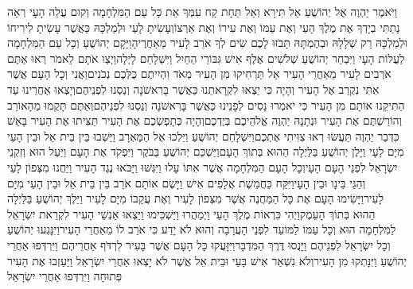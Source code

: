 \documentclass[../main/main.tex]{subfiles}
\begin{document}
\begin{multicols*}{\ncols}
וַיֹּאמֶר יַהְוֶה אֶל יְהוֹשֻׁעַ אַל תִּירָא וְאַל תֵּחָת קַח עִמְּךָ אֵת כָּל עַם הַמִּלְחָמָה וְקוּם עֲלֵה הָעָי רְאֵה נָתַתִּי בְיָדְךָ אֶת מֶלֶךְ הָעַי וְאֶת עַמּוֹ וְאֶת עִירוֹ וְאֶת אַרְצוֹ\PreVerseSpace{}וְעָשִׂיתָ לָעַי וּלְמַלְכָּהּ כַּאֲשֶׁר עָשִׂיתָ לִירִיחוֹ וּלְמַלְכָּהּ רַק שְׁלָלָהּ וּבְהֶמְתָּהּ תָּבֹזּוּ לָכֶם שִׂים לְךָ אֹרֵב לָעִיר מֵאַחֲרֶיהָ\PreVerseSpace{}וַיָּקָם יְהוֹשֻׁעַ וְכָל עַם הַמִּלְחָמָה לַעֲלוֹת הָעָי וַיִּבְחַר יְהוֹשֻׁעַ שְׁלֹשִׁים אֶלֶף אִישׁ גִּבּוֹרֵי הַחַיִל וַיִּשְׁלָחֵם לָיְלָה\PreVerseSpace{}וַיְצַו אֹתָם לֵאמֹר רְאוּ אַתֶּם אֹרְבִים לָעִיר מֵאַחֲרֵי הָעִיר אַל תַּרְחִיקוּ מִן הָעִיר מְאֹד וִהְיִיתֶם כֻּלְּכֶם נְכֹנִים\PreVerseSpace{}וַאֲנִי וְכָל הָעָם אֲשֶׁר אִתִּי נִקְרַב אֶל הָעִיר וְהָיָה כִּי יֵצְאוּ לִקְרָאתֵנוּ כַּאֲשֶׁר בָּרִאשֹׁנָה וְנַסְנוּ לִפְנֵיהֶם\PreVerseSpace{}וְיָצְאוּ אַחֲרֵינוּ עַד הַתִּיקֵנוּ אוֹתָם מִן הָעִיר כִּי יֹאמְרוּ נָסִים לְפָנֵינוּ כַּאֲשֶׁר בָּרִאשֹׁנָה וְנַסְנוּ לִפְנֵיהֶם\PreVerseSpace{}וְאַתֶּם תָּקֻמוּ מֵהָאוֹרֵב וְהוֹרַשְׁתֶּם אֶת הָעִיר וּנְתָנָהּ יַהְוֶה אֱלֹהֵיכֶם בְּיֶדְכֶם\PreVerseSpace{}וְהָיָה כְּתָפְשְׂכֶם אֶת הָעִיר תַּצִּיתוּ אֶת הָעִיר בָּאֵשׁ כִּדְבַר יַהְוֶה תַּעֲשׂוּ רְאוּ צִוִּיתִי אֶתְכֶם\PreVerseSpace{}וַיִּשְׁלָחֵם יְהוֹשֻׁעַ וַיֵּלְכוּ אֶל הַמַּאְרָב וַיֵּשְׁבוּ בֵּין בֵּית אֵל וּבֵין הָעַי מִיָּם לָעָי וַיָּלֶן יְהוֹשֻׁעַ בַּלַּיְלָה הַהוּא בְּתוֹךְ הָעָם\PreVerseSpace{}וַיַּשְׁכֵּם יְהוֹשֻׁעַ בַּבֹּקֶר וַיִּפְקֹד אֶת הָעָם וַיַּעַל הוּא וְזִקְנֵי יִשְׂרָאֵל לִפְנֵי הָעָם הָעָי\PreVerseSpace{}וְכָל הָעָם הַמִּלְחָמָה אֲשֶׁר אִתּוֹ עָלוּ וַיִּגְּשׁוּ וַיָּבֹאוּ נֶגֶד הָעִיר וַיַּחֲנוּ מִצְּפוֹן לָעַי וְהַגַּי בֵּינָו וּבֵין הָעָי\PreVerseSpace{}וַיִּקַּח כַּחֲמֵשֶׁת אֲלָפִים אִישׁ וַיָּשֶׂם אוֹתָם אֹרֵב בֵּין בֵּית אֵל וּבֵין הָעַי מִיָּם לָעִיר\PreVerseSpace{}וַיָּשִׂימוּ הָעָם אֶת כָּל הַמַּחֲנֶה אֲשֶׁר מִצְּפוֹן לָעִיר וְאֶת עֲקֵבוֹ מִיָּם לָעִיר וַיֵּלֶךְ יְהוֹשֻׁעַ בַּלַּיְלָה הַהוּא בְּתוֹךְ הָעֵמֶק\PreVerseSpace{}וַיְהִי כִּרְאוֹת מֶלֶךְ הָעַי וַיְמַהֲרוּ וַיַּשְׁכִּימוּ וַיֵּצְאוּ אַנְשֵׁי הָעִיר לִקְרַאת יִשְׂרָאֵל לַמִּלְחָמָה הוּא וְכָל עַמּוֹ לַמּוֹעֵד לִפְנֵי הָעֲרָבָה וְהוּא לֹא יָדַע כִּי אֹרֵב לוֹ מֵאַחֲרֵי הָעִיר\PreVerseSpace{}וַיִּנָּגְעוּ יְהוֹשֻׁעַ וְכָל יִשְׂרָאֵל לִפְנֵיהֶם וַיָּנֻסוּ דֶּרֶךְ הַמִּדְבָּר\PreVerseSpace{}וַיִּזָּעֲקוּ כָּל הָעָם אֲשֶׁר בָּעִיר לִרְדֹּף אַחֲרֵיהֶם וַיִּרְדְּפוּ אַחֲרֵי יְהוֹשֻׁעַ וַיִּנָּתְקוּ מִן הָעִיר\PreVerseSpace{}וְלֹא נִשְׁאַר אִישׁ בָּעַי וּבֵית אֵל אֲשֶׁר לֹא יָצְאוּ אַחֲרֵי יִשְׂרָאֵל וַיַּעַזְבוּ אֶת הָעִיר פְּתוּחָה וַיִּרְדְּפוּ אַחֲרֵי יִשְׂרָאֵל\OpenSection{}\par

\end{multicols*}
\end{document}
